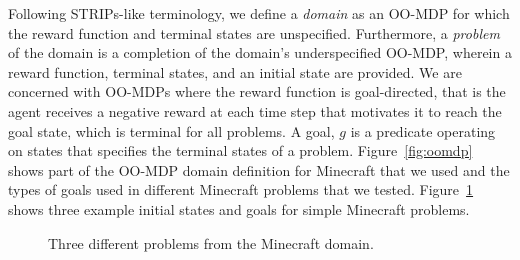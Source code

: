 \documentclass[letterpaper]{article}
\begin{document}

Following STRIPs-like terminology, we define a {\it domain} as an OO-MDP
for which the reward function and terminal
states are unspecified. Furthermore, a {\it problem} of the domain is a completion of the domain's underspecified OO-MDP,
wherein a reward function, terminal states, and an initial state are provided. We are
concerned with OO-MDPs where the reward function is goal-directed, that
is the agent receives a negative reward at each time step that motivates
it to reach the goal state, which is terminal for all problems.  A goal, $g$ is
a predicate operating on states that specifies the terminal states of a problem.
Figure~\ref{fig:oomdp} shows part of the OO-MDP domain definition
for Minecraft that we used and the types of goals used in different
Minecraft problems that we tested. Figure~\ref{fig:minecraft} shows
three example initial states and goals for simple Minecraft problems.

\begin{figure}[t]
\centering
{}
  \caption{Three different problems from the Minecraft domain.}
  \label{fig:minecraft}
\end{figure}
\end{document}
